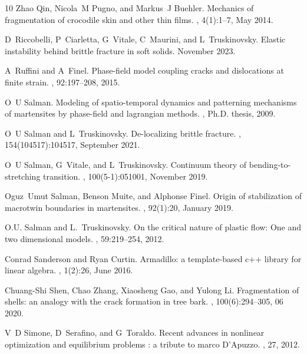 \documentclass[10pt]{article}
\begin{document}
\begin{thebibliography}{10}
    Zhao Qin, Nicola~M Pugno, and Markus~J Buehler.
    \newblock Mechanics of fragmentation of crocodile skin and other thin films.
    , 4(1):1--7, May 2014.

    D~Riccobelli, P~Ciarletta, G~Vitale, C~Maurini, and L~Truskinovsky.
    \newblock Elastic instability behind brittle fracture in soft solids.
    \newblock November 2023.

    A~Ruffini and A~Finel.
    \newblock Phase-field model coupling cracks and dislocations at finite strain.
    , 92:197--208, 2015.

    O~U Salman.
    \newblock Modeling of spatio-temporal dynamics and patterning mechanisms of martensites by phase-field and lagrangian methods.
    , Ph.D. thesis, 2009.

    O~U Salman and L~Truskinovsky.
    \newblock De-localizing brittle fracture.
    , 154(104517):104517, September 2021.

    O~U Salman, G~Vitale, and L~Truskinovsky.
    \newblock Continuum theory of bending-to-stretching transition.
    , 100(5-1):051001, November 2019.

    Oguz~Umut Salman, Benson Muite, and Alphonse Finel.
    \newblock Origin of stabilization of macrotwin boundaries in martensites.
    , 92(1):20, January 2019.

    O.U. Salman and L.~Truskinovsky.
    \newblock On the critical nature of plastic flow: One and two dimensional models.
    , 59:219--254, 2012.

    Conrad Sanderson and Ryan Curtin.
    \newblock Armadillo: a template-based c++ library for linear algebra.
    , 1(2):26, June 2016.

    Chuang-Shi Shen, Chao Zhang, Xiaosheng Gao, and Yulong Li.
    \newblock Fragmentation of shells: an analogy with the crack formation in tree bark.
    , 100(6):294--305, 06 2020.

    V~D Simone, D~Serafino, and G~Toraldo.
    \newblock Recent advances in nonlinear optimization and equilibrium problems : a tribute to marco {D'Apuzzo}.
    , 27, 2012.


\end{thebibliography}
\end{document}
